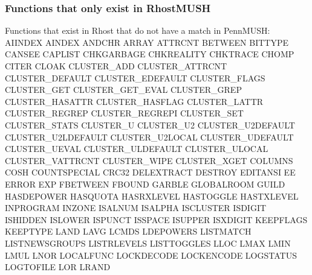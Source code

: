\documentclass[letterpaper,10pt,english]{sphinxmanual}
\begin{document}
\subsubsection{Functions that only exist in RhostMUSH}
\label{\detokenize{differences:functions-that-only-exist-in-rhostmush}}
\sphinxAtStartPar
Functions that exist in Rhost that do not have a match in PennMUSH:
AIINDEX                      AINDEX                        ANDCHR
ARRAY                        ATTRCNT                       BETWEEN
BITTYPE                      CANSEE                        CAPLIST
CHKGARBAGE                   CHKREALITY                    CHKTRACE
CHOMP                        CITER                         CLOAK
CLUSTER\_ADD                  CLUSTER\_ATTRCNT               CLUSTER\_DEFAULT
CLUSTER\_EDEFAULT             CLUSTER\_FLAGS                 CLUSTER\_GET
CLUSTER\_GET\_EVAL             CLUSTER\_GREP                  CLUSTER\_HASATTR
CLUSTER\_HASFLAG              CLUSTER\_LATTR                 CLUSTER\_REGREP
CLUSTER\_REGREPI              CLUSTER\_SET                   CLUSTER\_STATS
CLUSTER\_U                    CLUSTER\_U2                    CLUSTER\_U2DEFAULT
CLUSTER\_U2LDEFAULT           CLUSTER\_U2LOCAL               CLUSTER\_UDEFAULT
CLUSTER\_UEVAL                CLUSTER\_ULDEFAULT             CLUSTER\_ULOCAL
CLUSTER\_VATTRCNT             CLUSTER\_WIPE                  CLUSTER\_XGET
COLUMNS                      COSH                          COUNTSPECIAL
CRC32                        DELEXTRACT                    DESTROY
EDITANSI                     EE                            ERROR
EXP                          FBETWEEN                      FBOUND
GARBLE                       GLOBALROOM                    GUILD
HASDEPOWER                   HASQUOTA                      HASRXLEVEL
HASTOGGLE                    HASTXLEVEL                    INPROGRAM
INZONE                       ISALNUM                       ISALPHA
ISCLUSTER                    ISDIGIT                       ISHIDDEN
ISLOWER                      ISPUNCT                       ISSPACE
ISUPPER                      ISXDIGIT                      KEEPFLAGS
KEEPTYPE                     LAND                          LAVG
LCMDS                        LDEPOWERS                     LISTMATCH
LISTNEWSGROUPS               LISTRLEVELS                   LISTTOGGLES
LLOC                         LMAX                          LMIN
LMUL                         LNOR                          LOCALFUNC
LOCKDECODE                   LOCKENCODE                    LOGSTATUS
LOGTOFILE                    LOR                           LRAND
\end{document}

